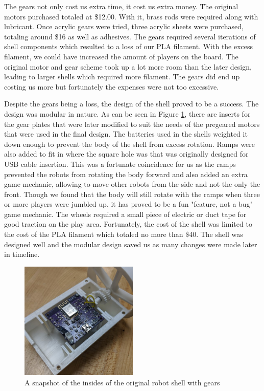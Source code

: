 \documentclass[11pt]{ieeeconf}
\begin{document}
The gears not only cost us extra time, it cost us extra money. The original motors purchased totaled at \$12.00. With it, brass rods were required along with lubricant. Once acrylic gears were tried, three acrylic sheets were purchased, totaling around \$16 as well as adhesives. The gears required several iterations of shell components which resulted to a loss of our PLA filament. With the excess filament, we could have increased the amount of players on the board. The original motor and gear scheme took up a lot more room than the later design, leading to larger shells which required more filament. The gears did end up costing us more but fortunately the expenses were not too excessive.

Despite the gears being a loss, the design of the shell proved to be a success. The design was modular in nature. As can be seen in Figure \ref{shell}, there are inserts for the gear plates that were later modified to suit the needs of the pregeared motors that were used in the final design. The batteries used in the shells weighted it down enough to prevent the body of the shell from excess rotation. Ramps were also added to fit in where the square hole was that was originally designed for USB cable insertion. This was a fortunate coincidence for us as the ramps prevented the robots from rotating the body forward and also added an extra game mechanic, allowing to move other robots from the side and not the only the front. Though we found that the body will still rotate with the ramps when three or more players were jumbled up, it has proved to be a fun "feature, not a bug" game mechanic. The wheels required a small piece of electric or duct tape for good traction on the play area. Fortunately, the cost of the shell was limited to the cost of the PLA filament which totaled no more than \$40. The shell was designed well and the modular design saved us as many changes were made later in timeline. 

\begin{figure}[H]
\centering
\captionsetup{justification=centering}
\includegraphics[width=0.5\textwidth]{images/Shell.png}
\caption{A snapshot of the insides of the original robot shell with gears}
\label{shell}
\end{figure}
\end{document}
